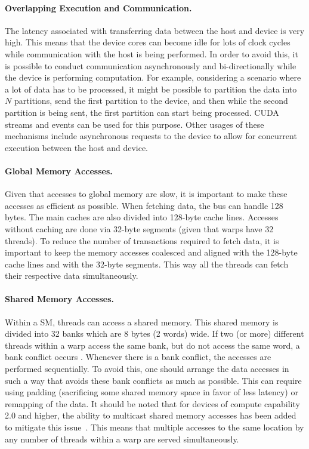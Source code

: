     \paragraph{\textbf{Overlapping Execution and Communication}.} The latency associated with transferring data between the host and device is very high. This means that the device cores can become idle for lots of clock cycles while communication with the host is being performed. In order to avoid this, it is possible to conduct communication asynchronously and bi-directionally while the device is performing computation. For example, considering a scenario where a lot of data has to be processed, it might be possible to partition the data into $N$ partitions, send the first partition to the device, and then while the second partition is being sent, the first partition can start being processed. \gls{CUDA} streams and events can be used for this purpose. Other usages of these mechanisms include asynchronous requests to the device to allow for concurrent execution between the host and device.

    \paragraph{\textbf{Global Memory Accesses}.}  Given that accesses to global memory are slow, it is important to make these accesses as efficient as possible. When fetching data, the bus can handle 128 bytes. The main caches are also divided into 128-byte cache lines. Accesses without caching are done via 32-byte segments (given that warps have 32 threads). To reduce the number of transactions required to fetch data, it is important to keep the memory accesses coalesced and aligned with the 128-byte cache lines and with the 32-byte segments. This way all the threads can fetch their respective data simultaneously.

    \paragraph{\textbf{Shared Memory Accesses}.} Within a \gls{SM}, threads can access a shared memory. This shared memory is divided into 32 banks which are 8 bytes (2 words) wide. If two (or more) different threads within a warp access the same bank, but do not access the same word, a bank conflict occurs 
    . Whenever there is a bank conflict, the accesses are performed sequentially. To avoid this, one should arrange the data accesses in such  a way that avoids these bank conflicts as much as possible. This can require using padding (sacrificing some shared memory space in favor of less latency) or remapping of the data. It should be noted that for devices of compute capability 2.0 and higher, the ability to multicast shared memory accesses has been added to mitigate this issue~\cite{blog:cuda_shared_memory}. This means that multiple accesses to the same location by any number of threads within a warp are served simultaneously.


